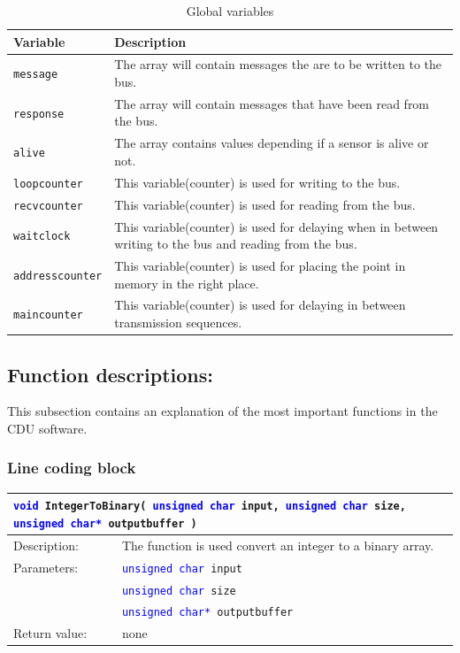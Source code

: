 \begin{table}[H]
\begin{tabular}{|l|p{10cm}|}
\hline
\cellcolor[gray]{0.8}\textbf{Variable} &\cellcolor[gray]{0.8} \textbf{Description}\\ \hline
\texttt{message} & The array will contain messages the are to be written to the bus.\\ 
\hline
\texttt{response} & The array will contain messages that have been read from the bus.\\ 
\hline
\texttt{alive} & The array contains values depending if a sensor is alive or not.\\ 
\hline
\texttt{loopcounter} & This variable(counter) is used for writing to the bus.\\ 
\hline
\texttt{recvcounter} & This variable(counter) is used for reading from the bus.\\ 
\hline
\texttt{waitclock} & This variable(counter) is used for delaying when in between writing to the bus and reading from the bus.\\ 
\hline
\texttt{addresscounter} & This variable(counter) is used for placing the point in memory in the right place.\\ 
\hline
\texttt{maincounter} & This variable(counter) is used for delaying in between transmission sequences.\\ 
\hline
\end{tabular}
\label{tab:globalvar}
\caption{Global variables}
\end{table}


\subsection{Function descriptions:}
This subsection contains an explanation of the most important functions in the CDU software.

\subsubsection{Line coding block}
\begin{table}[H]
\begin{tabular}{l p{12.5cm}}
\multicolumn{2}{p{15cm}}{\texttt{\textcolor{blue}{void} IntegerToBinary( \texttt{\textcolor{blue}{unsigned char} input, \textcolor{blue}{unsigned char} size, \textcolor{blue}{unsigned char*} outputbuffer  }) } } \\
\hline
Description:& The function is used convert an integer to a binary array.\\
Parameters:&\texttt{\textcolor{blue}{unsigned char} input}\\
&\texttt{\textcolor{blue}{unsigned char} size}\\
&\texttt{\textcolor{blue}{unsigned char*} outputbuffer}\\
Return value:&none\\
\end{tabular}
\end{table}

